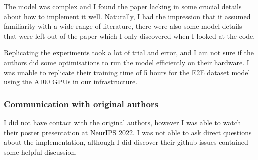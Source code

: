 The model was complex and I found the paper lacking in some crucial details about how to implement it well. Naturally, I had the impression that it assumed familiarity with a wide range of literature, there were also some model details that were left out of the paper which I only discovered when I looked at the code.

Replicating the experiments took a lot of trial and error, and I am not sure if the authors did some optimisations to run the model efficiently on their hardware. I was unable to replicate their training time of 5 hours for the E2E dataset model using the A100 GPUs in our infrastructure.

\subsubsection*{Communication with original authors}

I did not have contact with the original authors, however I was able to watch their poster presentation at NeurIPS 2022. I was not able to ask direct questions about the implementation, although I did discover their github issues contained some helpful discussion.
